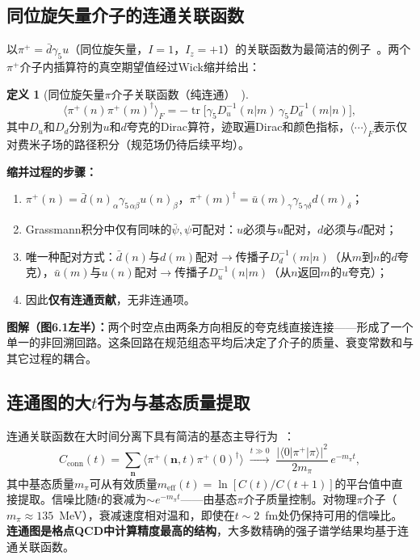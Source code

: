 \documentclass[12pt,a4paper]{ctexart}
\theoremstyle{definition}
\newtheorem{definition}{定义}[section]
\begin{document}
\subsection{同位旋矢量介子的连通关联函数}

以$\pi^+ = \bar d\gamma_5 u$（同位旋矢量，$I=1$，$I_z=+1$）的关联函数为最简洁的例子~\cite{GattringerLang2010}。两个$\pi^+$介子内插算符的真空期望值经过Wick缩并给出：

\begin{definition}[同位旋矢量$\pi$介子关联函数（纯连通）~\cite{GattringerLang2010}]
\begin{equation}
\boxed{\langle \pi^+(n) \pi^+(m)^\dagger \rangle_F = -\operatorname{tr}\!\big[\gamma_5 D_u^{-1}(n|m)\,\gamma_5 D_d^{-1}(m|n)\big]},
\label{eq:pion_connected}
\end{equation}
其中$D_u$和$D_d$分别为$u$和$d$夸克的Dirac算符，迹取遍Dirac和颜色指标，$\langle\cdots\rangle_F$表示仅对费米子场的路径积分（规范场仍待后续平均）。
\end{definition}

\textbf{缩并过程的步骤：}
\begin{enumerate}[nosep]
    \item $\pi^+(n) = \bar d(n)_\alpha \gamma_{5\,\alpha\beta} u(n)_\beta$，$\pi^+(m)^\dagger = \bar u(m)_\gamma \gamma_{5\,\gamma\delta} d(m)_\delta$；
    \item Grassmann积分中仅有同味的$\bar\psi, \psi$可配对：$u$必须与$u$配对，$d$必须与$d$配对；
    \item 唯一种配对方式：$\bar d(n)$与$d(m)$配对$\to$传播子$D_d^{-1}(m|n)$（从$m$到$n$的$d$夸克），$\bar u(m)$与$u(n)$配对$\to$传播子$D_u^{-1}(n|m)$（从$n$返回$m$的$u$夸克）；
    \item 因此\textbf{仅有连通贡献}，无非连通项。
\end{enumerate}

\textbf{图解（图6.1左半）：}两个时空点由两条方向相反的夸克线直接连接——形成了一个单一的非回溯回路。这条回路在规范组态平均后决定了介子的质量、衰变常数和与其它过程的耦合。

\subsection{连通图的大$t$行为与基态质量提取}

连通关联函数在大时间分离下具有简洁的基态主导行为~\cite{GattringerLang2010}：
\begin{equation}
C_{\text{conn}}(t) = \sum_{\mathbf{n}} \langle \pi^+(\mathbf{n}, t) \pi^+(0)^\dagger \rangle
\;\xrightarrow{t\gg 0}\;
\frac{|\langle 0|\pi^+|\pi\rangle|^2}{2m_\pi}\, e^{-m_\pi t},
\label{eq:conn_large_t}
\end{equation}
其中基态质量$m_\pi$可从有效质量$m_{\text{eff}}(t) = \ln[C(t)/C(t+1)]$的平台值中直接提取。信噪比随$t$的衰减为$\sim e^{-m_\pi t}$——由基态$\pi$介子质量控制。对物理$\pi$介子（$m_\pi \approx 135$~MeV），衰减速度相对温和，即使在$t \sim 2$~fm处仍保持可用的信噪比。\textbf{连通图是格点QCD中计算精度最高的结构}，大多数精确的强子谱学结果均基于连通关联函数。
\end{document}
